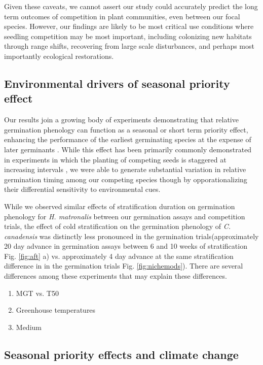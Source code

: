 \documentclass{article}\usepackage[]{graphicx}\usepackage[]{color}
\begin{document}
Given these caveats, we cannot assert our study could accurately predict the long term outcomes of competition in plant communities, even between our focal species. However, our findings are likely to be most critical use conditions where seedling competition may be most important, including colonizing new habitats through range shifts, recovering from large scale disturbances, and perhaps most importantly ecological restorations.

\subsection*{Environmental drivers of seasonal priority effect}
Our results join a growing body of experiments demonstrating that relative germination phenology can function as a seasonal or short term priority effect, enhancing the performance of the earliest germinating species at the expense of later germinants \citep{}. While this effect has been primarily commonly demonstrated in experiments in which the planting of competing seeds is staggered at increasing intervals \citep{}, we were able to generate substantial variation in relative germination timing among our competing species though by opporationalizing their differential sensitivity to environmental cues.

While we observed similar effects of stratification duration on germination phenology for \textit{H. matronalis} between our germination assays and competition trials, the effect of cold stratification on the germination phenology of \textit{C. canadensis} was distinctly less pronounced in the germination trials(approximately 20 day advance in germination assays between 6 and 10 weeks of stratification Fig. \ref{fig:aft} a) vs.  approximately 4 day advance at the same stratification difference  in in the germination trials Fig. \ref{fig:nichemods}). There are several differences among these experiments that may explain these differences.

\begin{enumerate}
\item MGT vs. T50
\item Greenhouse temperatures
\item Medium
\end{enumerate}
\subsection{Seasonal priority effects and climate change}
\end{document}
